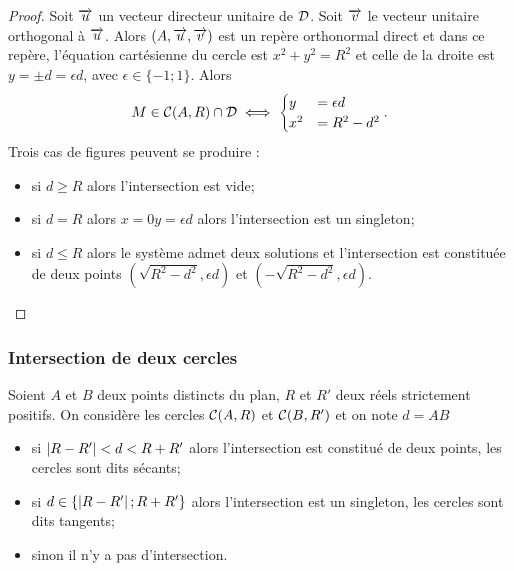 \begin{proof}
  Soit \(\overrightarrow{u}\) un vecteur directeur unitaire de \(\mathcal{D}\). Soit \(\overrightarrow{v}\) le 
  vecteur unitaire orthogonal à \(\overrightarrow{u}\). Alors \((A , \overrightarrow{u} , \overrightarrow{v})\) est un 
  repère orthonormal direct et dans ce repère, l'équation cartésienne du 
  cercle est \(x^2 + y^2 = R^2\) et celle de la droite est \(y = \pm d = 
  \epsilon d\), avec \(\epsilon \in \{-1; 1\}\). Alors 
  \begin{equation}
    M \in \mathcal{C}(A,R) \cap \mathcal{D} \iff 
    \begin{cases} y& = \epsilon d \\ x^2& = 
      R^2 - d^2
    \end{cases}.
  \end{equation}
  Trois cas de figures peuvent se produire :
  \begin{itemize}
    \item si \(d \geqslant R\) alors l'intersection est vide;
    \item si \(d = R\) alors \(x = 0 y = \epsilon d\) alors l'intersection 
      est un singleton;
    \item si \(d \leqslant R\) alors le système admet deux solutions et 
      l'intersection est constituée de deux points \((\sqrt{R^2 - 
      d^2},\epsilon d)\) et \((-\sqrt{R^2 - d^2},\epsilon d)\).
  \end{itemize}
\end{proof}

\subsubsection{Intersection de deux cercles}

\begin{prop}
  Soient \(A\) et \(B\) deux points distincts du plan, \(R\) et \(R'\) deux 
  réels strictement positifs. On considère les cercles \(\mathcal{C}(A,R)\) et 
  \(\mathcal{C}(B,R')\) et on note \(d = AB\)
  \begin{itemize}
    \item si \(\left\lvert R - R'\right\rvert < d < R + R'\) alors l'intersection est constitué de 
      deux points, les cercles sont dits sécants;
    \item si \(d \in \{\left\lvert R - R'\right\rvert ; R + R'\}\) alors l'intersection est un 
      singleton, les cercles sont dits tangents;
    \item sinon il n'y a pas d'intersection.
  \end{itemize}
\end{prop}

